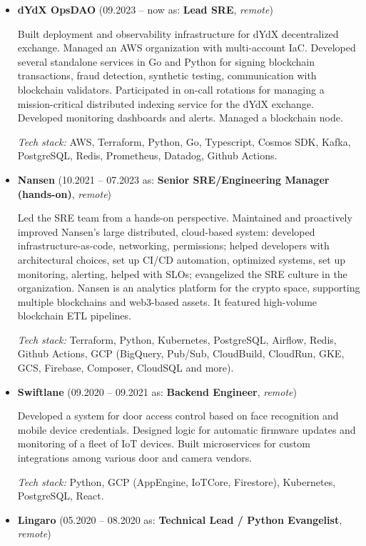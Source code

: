 \documentclass[12pt,a4paper]{article}
\begin{document}
\begin{itemize}[left=0pt]
  \item \textbf{dYdX OpsDAO} (09.2023 -- now as: \textbf{Lead SRE}, \textit{remote})

  Built deployment and observability infrastructure for dYdX decentralized exchange. Managed an AWS organization with multi-account IaC. Developed several standalone services in Go and Python for signing blockchain transactions, fraud detection, synthetic testing, communication with blockchain validators. Participated in on-call rotations for managing a mission-critical distributed indexing service for the dYdX exchange. Developed monitoring dashboards and alerts. Managed a blockchain node.

  \textit{Tech stack:} AWS, Terraform, Python, Go, Typescript, Cosmos SDK, Kafka, PostgreSQL, Redis, Prometheus, Datadog, Github Actions.

  \item \textbf{Nansen} (10.2021 -- 07.2023 as: \textbf{Senior SRE/Engineering Manager (hands-on)}, \textit{remote})

  Led the SRE team from a hands-on perspective. Maintained and proactively improved Nansen's large distributed, cloud-based system: developed infrastructure-as-code, networking, permissions; helped developers with architectural choices, set up CI/CD automation, optimized systems, set up monitoring, alerting, helped with SLOs; evangelized the SRE culture in the organization. Nansen is an analytics platform for the crypto space, supporting multiple blockchains and web3-based assets. It featured high-volume blockchain ETL pipelines.

  \textit{Tech stack:} Terraform, Python, Kubernetes, PostgreSQL, Airflow, Redis, Github Actions, GCP (BigQuery, Pub/Sub, CloudBuild, CloudRun, GKE, GCS, Firebase, Composer, CloudSQL and more).

  \item \textbf{Swiftlane} (09.2020 -- 09.2021 as: \textbf{Backend Engineer}, \textit{remote})

  Developed a system for door access control based on face recognition and mobile device credentials. Designed logic for automatic firmware updates and monitoring of a fleet of IoT devices. Built microservices for custom integrations among various door and camera vendors.

  \textit{Tech stack:} Python, GCP (AppEngine, IoTCore, Firestore), Kubernetes, PostgreSQL, React.

  \item \textbf{Lingaro} (05.2020 -- 08.2020 as: \textbf{Technical Lead / Python Evangelist}, \textit{remote})


\end{itemize}
\end{document}
